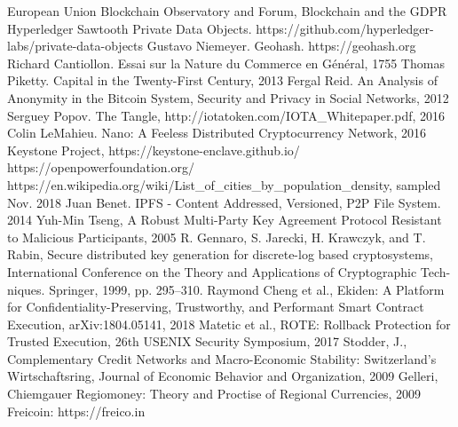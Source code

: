 \documentclass[conference]{IEEEtran}
\begin{document}
\begin{thebibliography}{00}
European Union Blockchain Observatory and Forum, Blockchain and the GDPR
Hyperledger Sawtooth Private Data Objects. https://github.com/hyperledger-labs/private-data-objects
Gustavo Niemeyer. Geohash. https://geohash.org
Richard Cantiollon. Essai sur la Nature du Commerce en Général, 1755
Thomas Piketty. Capital in the Twenty-First Century, 2013
Fergal Reid. An Analysis of Anonymity in the Bitcoin System, Security and Privacy in Social Networks, 2012
Serguey Popov. The Tangle, http://iotatoken.com/IOTA\_Whitepaper.pdf, 2016
Colin LeMahieu. Nano: A Feeless Distributed Cryptocurrency
Network, 2016
Keystone Project, https://keystone-enclave.github.io/
https://openpowerfoundation.org/
https://en.wikipedia.org/wiki/List\_of\_cities\_by\_population\_density, sampled Nov. 2018
Juan Benet. IPFS - Content Addressed, Versioned, P2P File System. 2014
Yuh-Min Tseng, A Robust Multi-Party Key Agreement Protocol Resistant to Malicious Participants, 2005
R. Gennaro, S. Jarecki, H. Krawczyk, and T. Rabin, Secure distributed
key generation for discrete-log based cryptosystems, International
Conference on the Theory and Applications of Cryptographic Tech-
niques. Springer, 1999, pp. 295–310.
Raymond Cheng et al., Ekiden: A Platform for Confidentiality-Preserving, Trustworthy, and Performant Smart Contract Execution, arXiv:1804.05141, 2018
Matetic et al., ROTE: Rollback Protection for Trusted Execution, 26th USENIX Security Symposium, 2017
Stodder, J., Complementary Credit Networks and Macro-Economic Stability: Switzerland’s Wirtschaftsring, Journal of Economic Behavior and Organization, 2009
Gelleri, Chiemgauer Regiomoney: Theory and Proctise of Regional Currencies, 2009
Freicoin: https://freico.in
\end{thebibliography}
\end{document}

